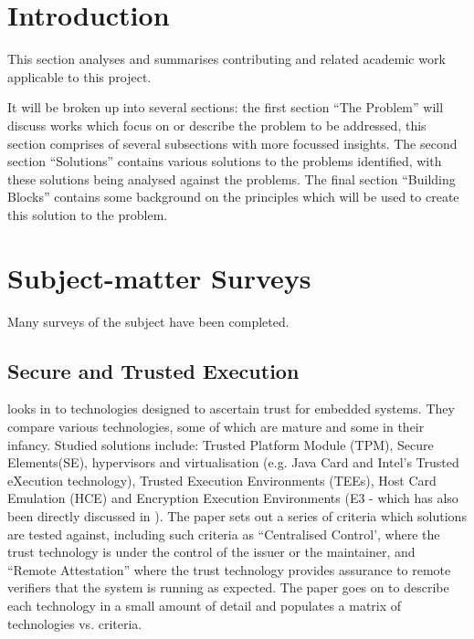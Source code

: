 \section{Introduction}

This section analyses and summarises contributing and related academic work applicable to this project.

It will be broken up into several sections: the first section ``The Problem'' will discuss works which focus on or describe the problem to be addressed, this section comprises of several subsections with more focussed insights. The second section ``Solutions'' contains various solutions to the problems identified, with these solutions being analysed against the problems. The final section ``Building Blocks'' contains some background on the principles which will be used to create this solution to the problem. 

\section{Subject-matter Surveys}

Many surveys of the subject have been completed.

\subsection{Secure and Trusted Execution}

\cite{Shepherd2016} looks in to technologies designed to ascertain trust for embedded systems. They compare various technologies, some of which are mature and some in their infancy. Studied solutions include: Trusted Platform Module (TPM), Secure Elements(SE), hypervisors and virtualisation (e.g. Java Card and Intel's Trusted eXecution technology), Trusted Execution Environments (TEEs), Host Card Emulation (HCE) and Encryption Execution Environments (E3 - which has also been directly discussed in \cite{Lee2016}). The paper sets out a series of criteria which solutions are tested against, including such criteria as ``Centralised Control', where the trust technology is under the control of the issuer or the maintainer, and ``Remote Attestation'' where the trust technology provides assurance to remote verifiers that the system is running as expected. The paper goes on to describe each technology in a small amount of detail and populates a matrix of technologies vs. criteria.

